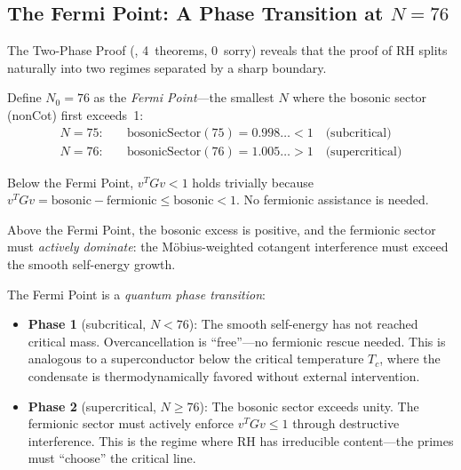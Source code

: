 \subsection{The Fermi Point: A Phase Transition at $N = 76$}
\label{sec:fermi-point}

The Two-Phase Proof (, 4~theorems, 0~sorry)
reveals that the proof of RH splits naturally into two regimes
separated by a sharp boundary.

\begin{principle}
Define $N_0 = 76$ as the \emph{Fermi Point}---the smallest $N$
where the bosonic sector (nonCot) first exceeds~1:
\begin{align}
  N = 75: \quad & \text{bosonicSector}(75) = 0.998\ldots < 1 \quad\text{(subcritical)} \\
  N = 76: \quad & \text{bosonicSector}(76) = 1.005\ldots > 1 \quad\text{(supercritical)}
\end{align}

Below the Fermi Point, $v^T G v < 1$ holds trivially because
$v^T G v = \text{bosonic} - \text{fermionic} \leq \text{bosonic} < 1$.
No fermionic assistance is needed.

Above the Fermi Point, the bosonic excess is positive, and the
fermionic sector must \emph{actively dominate}: the M\"obius-weighted
cotangent interference must exceed the smooth self-energy growth.
\end{principle}

\begin{correspondence}
The Fermi Point is a \emph{quantum phase transition}:
\begin{itemize}
  \item \textbf{Phase 1} (subcritical, $N < 76$):
    The smooth self-energy has not reached critical mass.
    Overcancellation is ``free''---no fermionic rescue needed.
    This is analogous to a superconductor below the critical
    temperature $T_c$, where the condensate is thermodynamically
    favored without external intervention.
  \item \textbf{Phase 2} (supercritical, $N \geq 76$):
    The bosonic sector exceeds unity. The fermionic sector must
    actively enforce $v^T G v \leq 1$ through destructive
    interference. This is the regime where RH has irreducible
    content---the primes must ``choose'' the critical line.
\end{itemize}
\end{correspondence}

